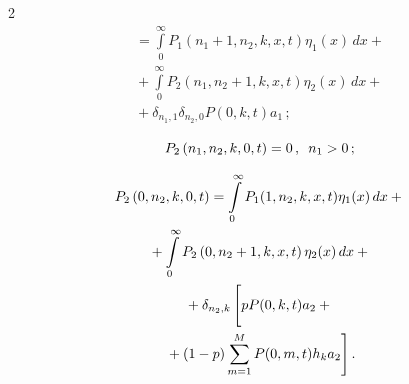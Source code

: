 \begin{multicols}{2}
\begin{multline}
{}=


\int\limits_0^{\infty}P_1\left(n_1+1,n_2,k,x,t\right)\eta_1(x)\,dx+{}\\


{}+\int\limits_0^{\infty}P_2\left(n_1,n_2+1,k,x,t\right)\eta_2(x)\,dx+{}\\


{}+


\delta_{n_1,1}\delta_{n_2,0}P(0,k,t)a_1\,;


\label{after4}


\end{multline}





\vspace*{-3pt}





\noindent


\begin{equation}


P_2\left(n_1,n_2,k,0,t\right)=0\,,\enskip n_1>0\,;


\label{after5}


\end{equation}





\vspace*{-12pt}





\noindent


\begin{multline}


P_2\left(0,n_2,k,0,t\right)=\int\limits_0^{\infty}P_1(1,n_2,k,x,t)\eta_1(x)\,dx+{}\\


{}+\int\limits_0^{\infty}P_2\left(0,n_2+1,k,x,t\right)


\eta_2(x)\,dx+{}\\


{}+\delta_{n_2,k}\left[


\vphantom{\sum\limits_{m=1}^{M}}


pP(0,k,t)a_2+{}\right.\\


\left.{}+(1-p)


\sum\limits_{m=1}^{M}P(0,m,t)h_k a_2\right].\label{after6}


\end{multline}






\end{multicols}
